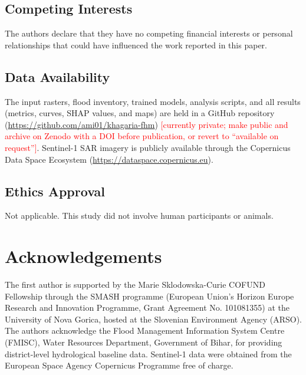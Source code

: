 \documentclass[12pt, a4paper]{article}
\begin{document}
\subsection*{Competing Interests}
The authors declare that they have no competing financial interests or personal relationships that could have influenced the work reported in this paper.

\subsection*{Data Availability}
The input rasters, flood inventory, trained models, analysis scripts, and all results (metrics, curves, SHAP values, and maps) are held in a GitHub repository (\url{https://github.com/ami01/khagaria-fhm}) \textcolor{red}{[currently private; make public and archive on Zenodo with a DOI before publication, or revert to ``available on request'']}. Sentinel-1 SAR imagery is publicly available through the Copernicus Data Space Ecosystem (\url{https://dataspace.copernicus.eu}).

\subsection*{Ethics Approval}
Not applicable. This study did not involve human participants or animals.

\section*{Acknowledgements}
The first author is supported by the Marie Sklodowska-Curie COFUND Fellowship through the SMASH programme (European Union's Horizon Europe Research and Innovation Programme, Grant Agreement No. 101081355) at the University of Nova Gorica, hosted at the Slovenian Environment Agency (ARSO). The authors acknowledge the
Flood Management Information System Centre (FMISC), Water Resources Department, Government of Bihar, for providing district-level hydrological baseline data. Sentinel-1 data were obtained from the European Space Agency Copernicus Programme free of charge.

\newpage





\newpage
\end{document}
